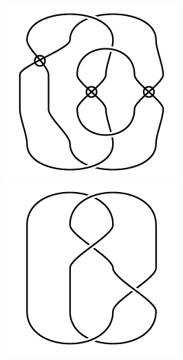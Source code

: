 \begin{figure}[H]
\begin{minipage}[b]{.18\linewidth}
\centering
\includegraphics[width=\linewidth]{../data/virtual_4_107.png}
\end{minipage}
\begin{minipage}[b]{.18\linewidth}
\centering
\includegraphics[width=\linewidth]{../data/virtual_4_108.png}
\end{minipage}
\end{figure}
